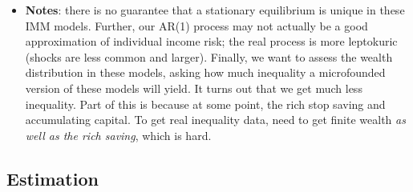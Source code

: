 \documentclass[12pt]{article}
\begin{document}
\begin{itemize}
    \item \textbf{Notes}: there is no guarantee that a stationary equilibrium is unique in these IMM models. Further, our AR(1) process may not actually be a good approximation of individual income risk; the real process is more leptokuric (shocks are less common and larger). Finally, we want to assess the wealth distribution in these models, asking how much inequality a microfounded version of these models will yield. It turns out that we get much less inequality. Part of this is because at some point, the rich stop saving and accumulating capital. To get real inequality data, need to get finite wealth \textit{as well as the rich saving}, which is hard.
\end{itemize}

\subsection{Estimation}
\end{document}
